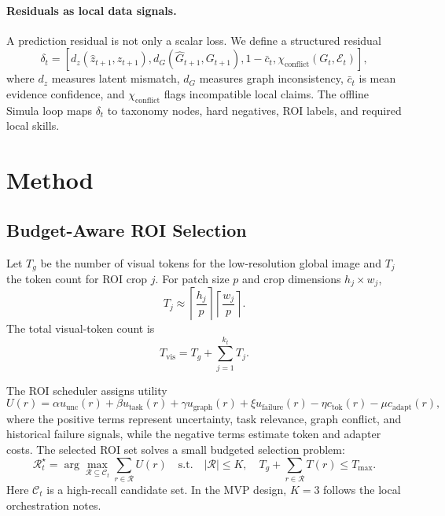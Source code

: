 \documentclass[11pt]{article}
\begin{document}
\paragraph{Residuals as local data signals.}
A prediction residual is not only a scalar loss.
We define a structured residual
\begin{equation}
  \delta_t =
  \left[
  d_z(\hat z_{t+1},z_{t+1}),
  d_G(\hat G_{t+1},G_{t+1}),
  1-\bar c_t,
  \chi_{\mathrm{conflict}}(G_t,\mathcal{E}_t)
  \right],
  \label{eq:residual}
\end{equation}
where $d_z$ measures latent mismatch, $d_G$ measures graph inconsistency, $\bar c_t$ is mean evidence confidence, and $\chi_{\mathrm{conflict}}$ flags incompatible local claims.
The offline Simula loop maps $\delta_t$ to taxonomy nodes, hard negatives, ROI labels, and required local skills.

\section{Method}

\subsection{Budget-Aware ROI Selection}

Let $T_g$ be the number of visual tokens for the low-resolution global image and $T_j$ the token count for ROI crop $j$.
For patch size $p$ and crop dimensions $h_j \times w_j$,
\begin{equation}
  T_j \approx \left\lceil \frac{h_j}{p} \right\rceil
          \left\lceil \frac{w_j}{p} \right\rceil.
\end{equation}
The total visual-token count is
\begin{equation}
  T_{\mathrm{vis}} = T_g + \sum_{j=1}^{k_t} T_j.
  \label{eq:tokens}
\end{equation}

The ROI scheduler assigns utility
\begin{equation}
  U(r)
  =
  \alpha u_{\mathrm{unc}}(r)
  + \beta u_{\mathrm{task}}(r)
  + \gamma u_{\mathrm{graph}}(r)
  + \xi u_{\mathrm{failure}}(r)
  - \eta c_{\mathrm{tok}}(r)
  - \mu c_{\mathrm{adapt}}(r),
  \label{eq:roi-utility}
\end{equation}
where the positive terms represent uncertainty, task relevance, graph conflict, and historical failure signals, while the negative terms estimate token and adapter costs.
The selected ROI set solves a small budgeted selection problem:
\begin{equation}
  \mathcal{R}_t^\star
  =
  \arg\max_{\mathcal{R}\subseteq \mathcal{C}_t}
  \sum_{r\in\mathcal{R}} U(r)
  \quad
  \mathrm{s.t.}
  \quad
  |\mathcal{R}|\le K,\quad
  T_g+\sum_{r\in\mathcal{R}}T(r)\le T_{\max}.
  \label{eq:roi-select}
\end{equation}
Here $\mathcal{C}_t$ is a high-recall candidate set.
In the MVP design, $K=3$ follows the local orchestration notes.
\end{document}
